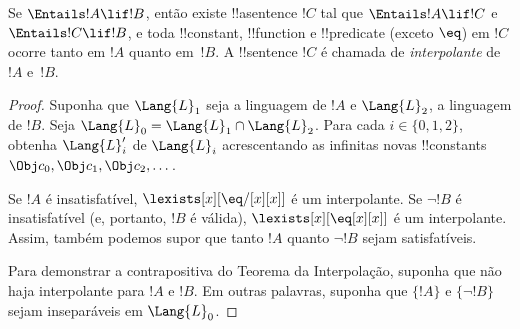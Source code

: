 \documentclass[../../../include/open-logic-section]{subfiles}
\begin{document}


\begin{thm}
Se $\Entails !A \lif !B$, então existe !!a{sentence} $!C$ tal que
$\Entails !A \lif !C$ e $\Entails !C \lif !B$, e toda !!{constant},
!!{function} e !!{predicate} (exceto $\eq$) em $!C$ ocorre tanto em
$!A$ quanto em~$!B$. A !!{sentence} $!C$ é chamada de
\emph{interpolante} de $!A$ e~$!B$.
\end{thm}

\begin{proof}
Suponha que $\Lang{L}_1$ seja a linguagem de $!A$ e $\Lang{L}_2$, a
linguagem de $!B$. Seja
$\Lang{L}_0 = \Lang{L}_1 \cap \Lang{L}_2$. Para cada
$i \in \{0, 1, 2 \}$, obtenha $\Lang{L}'_i$ de $\Lang{L}_i$
acrescentando as infinitas novas !!{constant}s $\Obj c_0, \Obj c_1,
\Obj c_2, \dots$.

Se $!A$ é insatisfatível, $\lexists[x][\eq/[x][x]]$ é um
interpolante. Se $\lnot !B$ é insatisfatível (e, portanto, $!B$ é
válida), $\lexists[x][\eq[x][x]]$ é um interpolante. Assim, também
podemos supor que tanto $!A$ quanto $\lnot !B$ sejam satisfatíveis.

Para demonstrar a contrapositiva do Teorema da Interpolação, suponha
que não haja interpolante para $!A$ e $!B$. Em outras palavras,
suponha que $\{!A\}$ e $\{\lnot !B\}$ sejam inseparáveis em
$\Lang{L}_0$.


\end{proof}
\end{document}
